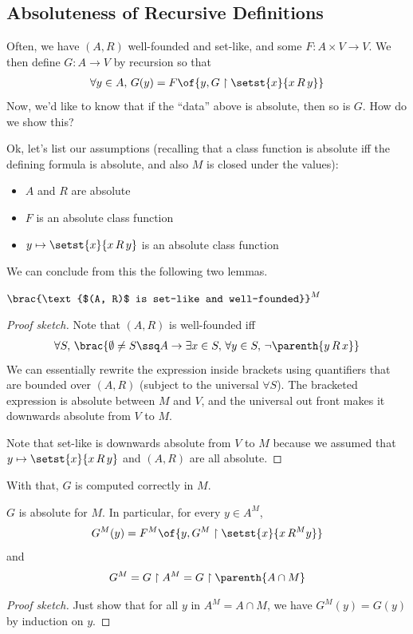 \subsection{Absoluteness of Recursive Definitions} \label{Ch3:Subsec:Recursion}

Often, we have $(A, R)$ well-founded and set-like, and some $F : A \times V \to V$. We then define $G : A \to V$ by recursion so that
\begin{align*}
    \forall y \in A, \, G(y) = F\of{y, G \restriction \setst{x}{x \, R \, y}}
\end{align*}
Now, we'd like to know that if the ``data'' above is absolute, then so is $G$. How do we show this?

Ok, let's list our assumptions (recalling that a class function is absolute iff the defining formula is absolute, and also $M$ is closed under the values):
\begin{itemize}
    \item $A$ and $R$ are absolute
    \item $F$ is an absolute class function
    \item $y \mapsto \setst{x}{x \, R \, y}$ is an absolute class function
\end{itemize}
We can conclude from this the following two lemmas.

\begin{boxlemma}
    $\brac{\text{$(A, R)$ is set-like and well-founded}}^M$
\end{boxlemma}
\begin{proof}[Proof sketch]
    Note that $(A, R)$ is well-founded iff
    \begin{align*}
        \forall S, \, \brac{\emptyset \ne S \ssq A \to \exists x \in S, \, \forall y \in S,\, \neg \parenth{y \, R \, x}}
    \end{align*}
    We can essentially rewrite the expression inside brackets using quantifiers that are bounded over $(A, R)$ (subject to the universal $\forall S$). The bracketed expression is absolute between $M$ and $V$, and the universal out front makes it downwards absolute from $V$ to $M$.

    Note that set-like is downwards absolute from $V$ to $M$ because we assumed that $y \mapsto \setst{x}{x \, R \, y}$ and $(A, R)$ are all absolute.
\end{proof}

With that, $G$ is computed correctly in $M$.

\begin{boxlemma}
    $G$ is absolute for $M$. In particular, for every $y \in A^M$,
    \begin{align*}
        G^M(y) = F^M\of{y, G^M \restriction \setst{x}{x \, R^M y}}
    \end{align*}
    and
    \begin{align*}
        G^M = G \restriction A^M = G \restriction \parenth{A \cap M}
    \end{align*}
\end{boxlemma}
\begin{proof}[Proof sketch]
    Just show that for all $y$ in $A^M = A \cap M$, we have $G^M(y) = G(y)$ by induction on $y$.
\end{proof}

